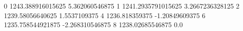 0 1243.388916015625 5.362060546875
1 1241.2935791015625 3.2667236328125
2 1239.58056640625 1.5537109375
4 1236.818359375 -1.20849609375
6 1235.758544921875 -2.268310546875
8 1238.02685546875 0.0
